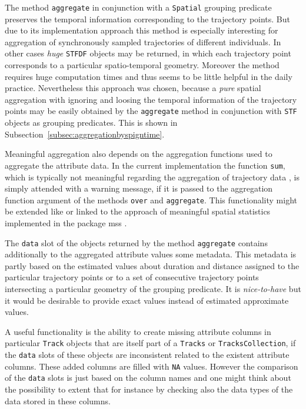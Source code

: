 \documentclass[12pt, oneside, a4paper]{scrbook}
\newcommand{\pkg}[1]{{\normalfont\fontseries{b}\selectfont #1}}
\let\code=\texttt
\begin{document}
The method \code{aggregate} in conjunction with a \code{Spatial} grouping predicate preserves the temporal information corresponding to the trajectory points. 
But due to its implementation approach this method is especially interesting for aggregation of synchronously sampled trajectories of different individuals. 
In other cases \textit{huge} \code{STFDF} objects may be returned, in which each trajectory point corresponds to a particular spatio-temporal geometry.
Moreover the method requires huge computation times and thus seems to be little helpful in the daily practice.
Nevertheless this approach was chosen, because a \textit{pure} spatial aggregation with ignoring and loosing the temporal information of the trajectory points may be easily obtained by the \code{aggregate} method in conjunction with \code{STF} objects as grouping predicates.
This is shown in Subsection~\ref{subsec:aggregationbyspigntime}.
\par\medskip

Meaningful aggregation also depends on the aggregation functions used to aggregate the attribute data. 
In the current implementation the function \code{sum}, which is typically not meaningful regarding the aggregation of trajectory data \citep{stasch_meaningful_2014}, is simply attended with a warning message, if it is passed to the aggregation function argument of the methods \code{over} and \code{aggregate}. 
This functionality might be extended like or linked to the approach of meaningful spatial statistics implemented in the package \pkg{mss} \citep{stasch_meaningful_2014}.
\par\medskip

The \code{data} slot of the objects returned by the method \code{aggregate} contains additionally to the aggregated attribute values some metadata.
This metadata is partly based on the estimated values about duration and distance assigned to the particular trajectory points or to a set of consecutive trajectory points intersecting a particular geometry of the grouping predicate.
It is \textit{nice-to-have} but it would be desirable to provide exact values instead of estimated approximate values.
\par\medskip

A useful functionality is the ability to create missing attribute columns in particular \code{Track} objects that are itself part of a \code{Tracks} or \code{TracksCollection}, if the \code{data} slots of these objects are inconsistent related to the existent attribute columns. 
These added columns are filled with \code{NA} values. 
However the comparison of the \code{data} slots is just based on the column names and one might think about the possibility to extent that for instance by checking also the data types of the data stored in these columns.
\par\medskip
\end{document}
